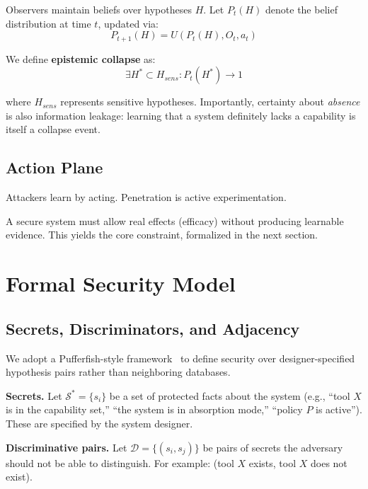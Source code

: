 \documentclass[11pt,a4paper]{article}
\begin{document}
Observers maintain beliefs over hypotheses $H$. Let $P_t(H)$ denote the belief distribution at time $t$, updated via:
\begin{equation}
P_{t+1}(H) = U(P_t(H), O_t, a_t)
\end{equation}

We define \textbf{epistemic collapse} as:
\begin{equation}
\exists H^* \subset H_{sens} : P_t(H^*) \to 1
\end{equation}

where $H_{sens}$ represents sensitive hypotheses. Importantly, certainty about \textit{absence} is also information leakage: learning that a system definitely lacks a capability is itself a collapse event.

\subsection{Action Plane}

Attackers learn by acting. Penetration is active experimentation.

A secure system must allow real effects (efficacy) without producing learnable evidence. This yields the core constraint, formalized in the next section.

\section{Formal Security Model}

\subsection{Secrets, Discriminators, and Adjacency}

We adopt a Pufferfish-style framework~\cite{kifer2014pufferfish} to define security over designer-specified hypothesis pairs rather than neighboring databases.

\textbf{Secrets.} Let $\mathcal{S}^* = \{s_i\}$ be a set of protected facts about the system (e.g., ``tool $X$ is in the capability set,'' ``the system is in absorption mode,'' ``policy $P$ is active''). These are specified by the system designer.

\textbf{Discriminative pairs.} Let $\mathcal{D} = \{(s_i, s_j)\}$ be pairs of secrets the adversary should not be able to distinguish. For example: (tool $X$ exists, tool $X$ does not exist).
\end{document}
